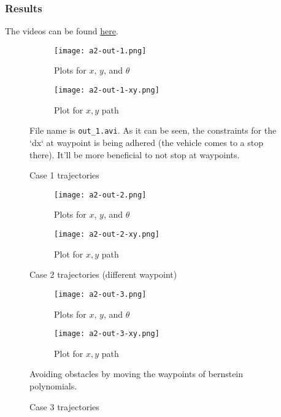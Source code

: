 \subsubsection{Results}

The videos can be found \href{https://iiitaphyd-my.sharepoint.com/:f:/g/personal/avneesh_mishra_research_iiit_ac_in/EogE243Ab4lDvm5VSueCLY8B7tLHOWnVw8i8PQnv5Bndfg?e=k8xJ1n}{here}.

\begin{figure}[ht]
    \centering
    \begin{subfigure}[b]{0.3\textwidth}
        \texttt{[image: a2-out-1.png]}
        \caption{Plots for $x$, $y$, and $\theta$}
    \end{subfigure}
    \begin{subfigure}[b]{0.6\textwidth}
        \texttt{[image: a2-out-1-xy.png]}
        \caption{Plot for $x, y$ path}
    \end{subfigure}
    \caption{Case 1 trajectories}
    \label{fig:case-1-traj}
    \small
        File name is \texttt{out\_1.avi}. As it can be seen, the constraints for the `dx` at waypoint is being adhered (the vehicle comes to a stop there). It'll be more beneficial to not stop at waypoints.
\end{figure}

\begin{figure}
    \centering
    \begin{subfigure}[b]{0.3\textwidth}
        \texttt{[image: a2-out-2.png]}
        \caption{Plots for $x$, $y$, and $\theta$}
    \end{subfigure}
    \begin{subfigure}[b]{0.5\textwidth}
        \texttt{[image: a2-out-2-xy.png]}
        \caption{Plot for $x, y$ path}
    \end{subfigure}
    \caption{Case 2 trajectories (different waypoint)}
    \label{fig:case-2-traj}
\end{figure}

\begin{figure}
    \centering
    \begin{subfigure}[b]{0.3\textwidth}
        \texttt{[image: a2-out-3.png]}
        \caption{Plots for $x$, $y$, and $\theta$}
    \end{subfigure}
    \begin{subfigure}[b]{0.5\textwidth}
        \texttt{[image: a2-out-3-xy.png]}
        \caption{Plot for $x, y$ path}
    \end{subfigure}
    \caption{Case 3 trajectories}
    \label{fig:case-3-traj}
    \small
        Avoiding obstacles by moving the waypoints of bernstein polynomials.
\end{figure}

